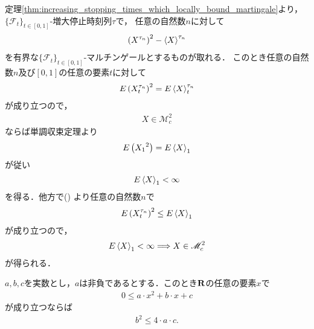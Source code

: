 	\begin{sketch}
		定理\ref{thm:increasing_stopping_times_which_locally_bound_martingale}より，
		$\{\mathscr{F}_{t}\}_{t \in [0,1]}$-増大停止時刻列$\tau$で，
		任意の自然数$n$に対して
		\begin{align}
			\left(X^{\tau_{n}}\right)^{2} - \inprod<X>^{\tau_{n}}
		\end{align}
		を有界な$\{\mathscr{F}_{t}\}_{t \in [0,1]}$-マルチンゲールとするものが取れる．
		このとき任意の自然数$n$及び$[0,1]$の任意の要素$t$に対して
		\begin{align}
			E\left(X^{\tau_{n}}_{t}\right)^{2} = E\inprod<X>^{\tau_{n}}_{t}
			\label{fom:square_integrable_iff_quadratic_variation_integrable}
		\end{align}
		が成り立つので，
		\begin{align}
			X \in \mathscr{M}_{c}^{2}
		\end{align}
		ならば単調収束定理より
		\begin{align}
			E\left({X_{1}}^{2}\right) = E\inprod<X>_{1}
		\end{align}
		が従い
		\begin{align}
			E\inprod<X>_{1} < \infty
		\end{align}
		を得る．他方で()
		より任意の自然数$n$で
		\begin{align}
			E\left(X^{\tau_{n}}_{t}\right)^{2} \leq E\inprod<X>_{1}
		\end{align}
		が成り立つので，
		\begin{align}
			E\inprod<X>_{1} < \infty \Longrightarrow X \in \mathscr{M}_{c}^{2}
		\end{align}
		が得られる．
		\QED
	\end{sketch}
	
	\begin{screen}
		\begin{thm}[二次関数が非負であるための条件]
		\label{thm:nonnegative_condition_of_quadratic_function}
			$a,b,c$を実数とし，$a$は非負であるとする．このとき$\mathbf{R}$の任意の要素$x$で
			\begin{align}
				0 \leq a \cdot x^{2} + b \cdot x + c
				\label{fom:nonnegative_condition_of_quadratic_function}
			\end{align}
			が成り立つならば
			\begin{align}
				b^{2} \leq 4 \cdot a \cdot c.
			\end{align}
		\end{thm}
	\end{screen}
	
